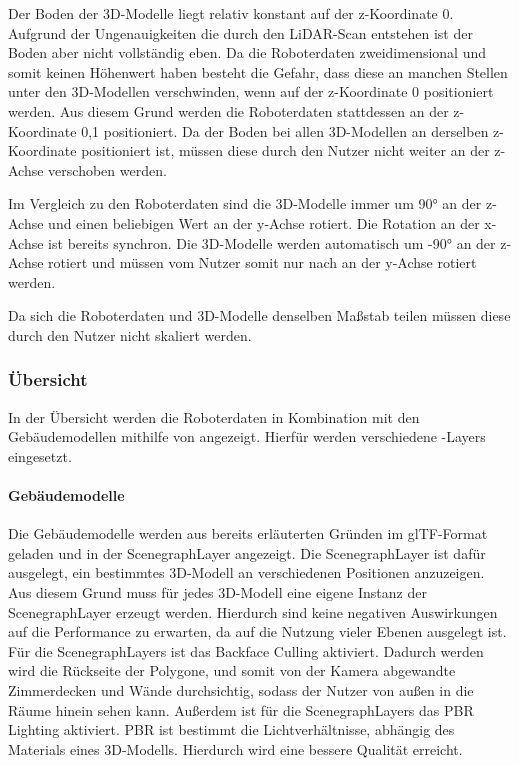 Der Boden der 3D-Modelle liegt relativ konstant auf der z-Koordinate 0. Aufgrund der Ungenauigkeiten die durch den \ac{LiDAR}-Scan entstehen ist der Boden aber nicht vollständig eben. Da die Roboterdaten zweidimensional und somit keinen Höhenwert haben besteht die Gefahr, dass diese an manchen Stellen unter den 3D-Modellen verschwinden, wenn auf der z-Koordinate 0 positioniert werden. Aus diesem Grund werden die Roboterdaten stattdessen an der z-Koordinate 0,1 positioniert. Da der Boden bei allen 3D-Modellen an derselben z-Koordinate positioniert ist, müssen diese durch den Nutzer nicht weiter an der z-Achse verschoben werden.

Im Vergleich zu den Roboterdaten sind die 3D-Modelle immer um 90° an der z-Achse und einen beliebigen Wert an der y-Achse rotiert. Die Rotation an der x-Achse ist bereits synchron. Die 3D-Modelle werden automatisch um -90° an der z-Achse rotiert und müssen vom Nutzer somit nur nach an der y-Achse rotiert werden.

Da sich die Roboterdaten und 3D-Modelle denselben Maßstab teilen müssen diese durch den Nutzer nicht skaliert werden.

\subsubsection{Übersicht}
In der Übersicht werden die Roboterdaten in Kombination mit den Gebäudemodellen mithilfe von \deckgl{}  angezeigt. Hierfür werden verschiedene \deckgl{}-Layers eingesetzt.

\paragraph{Gebäudemodelle}
Die Gebäudemodelle werden aus bereits erläuterten Gründen im \ac{glTF}-Format geladen und in der ScenegraphLayer angezeigt. Die ScenegraphLayer ist dafür ausgelegt, ein bestimmtes 3D-Modell an verschiedenen Positionen anzuzeigen. Aus diesem Grund muss für jedes 3D-Modell eine eigene Instanz der ScenegraphLayer erzeugt werden. 
Hierdurch sind keine negativen Auswirkungen auf die Performance zu erwarten, da \deckgl{} auf die Nutzung vieler Ebenen ausgelegt ist.
Für die ScenegraphLayers ist das Backface Culling aktiviert.
Dadurch werden wird die Rückseite der Polygone, und somit von der Kamera abgewandte Zimmerdecken und Wände durchsichtig, sodass der Nutzer von außen in die Räume hinein sehen kann. 
Außerdem ist für die ScenegraphLayers das \ac{PBR} Lighting aktiviert. \ac{PBR} ist bestimmt die Lichtverhältnisse, abhängig des Materials eines 3D-Modells. Hierdurch wird eine bessere Qualität erreicht.


